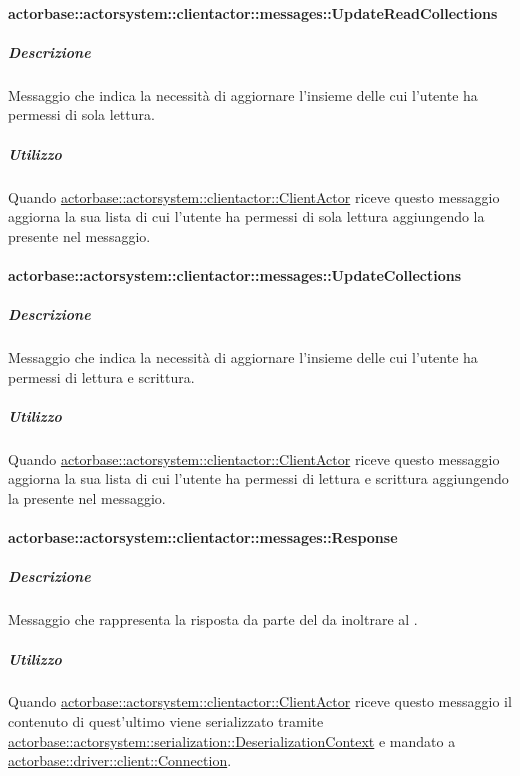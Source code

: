 \documentclass{scalatekids-article}
\begin{document}
\paragraph{actorbase::actorsystem::clientactor::messages::UpdateReadCollections}
\label{sec:actorbase::actorsystem::clientactor::messages::UpdateReadCollections}

\subparagraph{Descrizione}

Messaggio che indica la necessità di aggiornare l'insieme delle
 cui l'utente ha permessi di sola lettura.

\subparagraph{Utilizzo}

Quando \hyperref[sec:actorbase::actorsystem::clientactor::ClientActor]{actorbase::actorsystem::clientactor::ClientActor}
riceve questo messaggio aggiorna la sua lista di 
cui l'utente ha permessi di sola lettura aggiungendo la
 presente nel messaggio.

\paragraph{actorbase::actorsystem::clientactor::messages::UpdateCollections}
\label{sec:actorbase::actorsystem::clientactor::messages::UpdateCollections}

\subparagraph{Descrizione}

Messaggio che indica la necessità di aggiornare l'insieme delle
 cui l'utente ha permessi di lettura e scrittura.

\subparagraph{Utilizzo}

Quando \hyperref[sec:actorbase::actorsystem::clientactor::ClientActor]{actorbase::actorsystem::clientactor::ClientActor}
riceve questo messaggio aggiorna la sua lista di 
cui l'utente ha permessi di lettura e scrittura aggiungendo
la  presente nel messaggio.

\paragraph{actorbase::actorsystem::clientactor::messages::Response}
\label{sec:actorbase::actorsystem::clientactor::messages::Response}

\subparagraph{Descrizione}

Messaggio che rappresenta la risposta da parte del  da inoltrare
al .

\subparagraph{Utilizzo}

Quando \hyperref[sec:actorbase::actorsystem::clientactor::ClientActor]{actorbase::actorsystem::clientactor::ClientActor}
riceve questo messaggio il contenuto di quest'ultimo viene serializzato tramite
\hyperref[sec:actorbase::actorsystem::serialization::DeserializationContext]{actorbase::actorsystem::serialization::DeserializationContext}
e mandato a \hyperref[sec:actorbase::driver::client::Connection]{actorbase::driver::\allowbreak{}client::\allowbreak{}Connection}.
\end{document}
